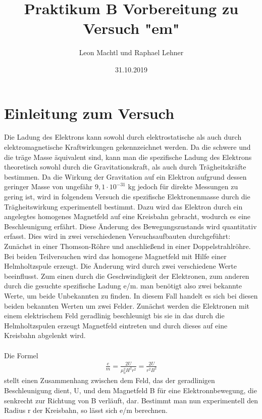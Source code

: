 \documentclass[a4paper,10pt]{scrartcl}
\title{Praktikum B Vorbereitung zu Versuch "em"}
\author{Leon Machtl und Raphael Lehner}
\date{31.10.2019}
\begin{document}
	\maketitle
	\tableofcontents
	\newpage
	
	\section{Einleitung zum Versuch}
	
	Die Ladung des Elektrons kann sowohl durch elektrostatische als auch durch elektromagnetische Kraftwirkungen gekennzeichnet werden. Da die schwere und die träge Masse äquivalent sind, kann man die spezifische Ladung des Elektrons theoretisch sowohl durch die Gravitationskraft, als auch durch Trägheitskräfte bestimmen. Da die Wirkung der Gravitation auf ein Elektron aufgrund dessen geringer Masse von ungefähr $9,1\cdot10^{-31}$ kg jedoch für direkte Messungen zu gering ist, wird in folgendem Versuch die spezifische Elektronenmasse durch die Trägheitswirkung experimentell bestimmt. Dazu wird das Elektron durch ein angelegtes homogenes Magnetfeld auf eine Kreisbahn gebracht, wodurch es eine Beschleunigung erfährt. Diese Änderung des Bewegungszustands wird quantitativ erfasst. Dies wird in zwei verschiedenen Versuchsaufbauten durchgeführt: Zunächst in einer Thomson-Röhre und anschließend in einer Doppelstrahlröhre. Bei beiden Teilversuchen wird das homogene Magnetfeld mit Hilfe einer Helmholtzspule erzeugt. Die Änderung wird durch zwei verschiedene Werte beeinflusst. Zum einen durch die Geschwindigkeit der Elektronen, zum anderen durch die gesuchte spezifische Ladung e/m. man benötigt also zwei bekannte Werte, um beide Unbekannten zu finden. In diesem Fall handelt es sich bei diesen beiden bekannten Werten um zwei Felder. Zunächst werden die Elektronen mit einem elektrischem Feld geradlinig beschleunigt bis sie in das durch die Helmholtzspulen erzeugt Magnetfeld eintreten und durch dieses auf eine Kreisbahn abgelenkt wird.\\
	\\
	Die Formel 
	\begin{align}
	\frac{e}{m}=\frac{2U}{\mu_{0}^2H^2r^2}=\frac{2U}{r^2B^2}
	\end{align}
	stellt einen Zusammenhang zwischen dem Feld, das der geradlinigen Beschleunigung dient, U, und dem Magnetfeld B für eine Elektronnbewegung, die senkrecht zur Richtung von B verläuft, dar. Bestimmt man nun experimentell den Radius r der Kreisbahn, so lässt sich e/m berechnen.
	
\end{document}
